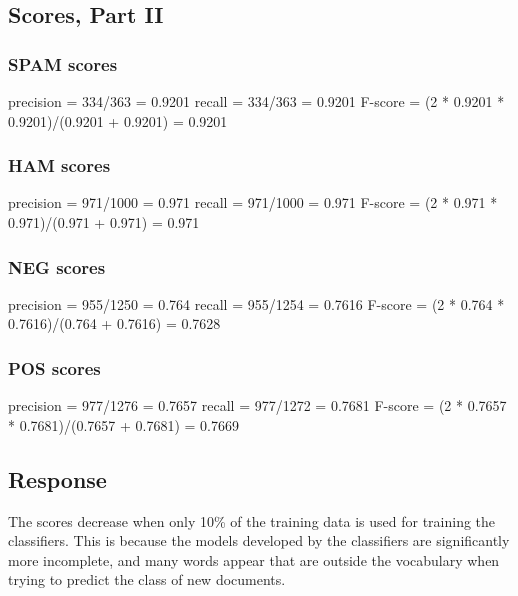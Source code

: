 \documentclass[12pt]{article}
\begin{document}
\subsection{Scores, Part II}
\subsubsection{SPAM scores}
precision = 334/363 = 0.9201
recall = 334/363 = 0.9201
F-score = (2 * 0.9201 * 0.9201)/(0.9201 + 0.9201) = 0.9201

\subsubsection{HAM scores}
precision = 971/1000 = 0.971
recall = 971/1000 = 0.971
F-score = (2 * 0.971 * 0.971)/(0.971 + 0.971) = 0.971

\subsubsection{NEG scores}
precision = 955/1250 = 0.764
recall = 955/1254 = 0.7616
F-score = (2 * 0.764 * 0.7616)/(0.764 + 0.7616) = 0.7628

\subsubsection{POS scores}
precision = 977/1276 = 0.7657
recall = 977/1272 = 0.7681
F-score = (2 * 0.7657 * 0.7681)/(0.7657 + 0.7681) = 0.7669

\subsection{Response}
The scores decrease when only 10\% of the training data is used for training the classifiers. This is because the models developed by the classifiers are significantly more incomplete, and many words appear that are outside the vocabulary when trying to predict the class of new documents.
\end{document}
